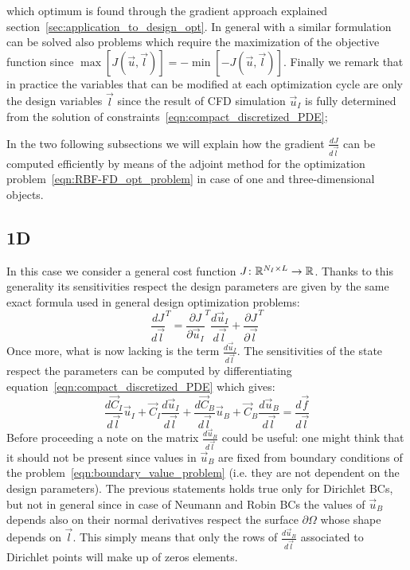 which optimum is found through the gradient approach explained section~\vref{sec:application_to_design_opt}. In general with a similar formulation can be solved also problems which require the maximization of the objective function since $\max \left[ J(\vec{u}, \vec{l}) \right] = - \min \left[ - J(\vec{u}, \vec{l}) \right]$. Finally we remark that in practice the variables that can be modified at each optimization cycle are only the design variables $\vec{l}$ since the result of CFD simulation $\vec{u}_I$ is fully determined from the solution of constraints~\eqref{eqn:compact_discretized_PDE};

In the two following subsections we will explain how the gradient $\frac{dJ}{d\vec{l}}$ can be computed efficiently by means of the adjoint method for the optimization problem~\eqref{eqn:RBF-FD_opt_problem} in case of one and three-dimensional objects.


\subsection{1D}
\label{subsec:adjoint_method_RBF-FD_1D}

In this case we consider a general cost function $J \colon \mathbb{R}^{N_I \times L} \to \mathbb{R}$. Thanks to this generality its sensitivities respect the design parameters are given by the same exact formula used in general design optimization problems:
\begin{equation}
	\label{eqn:}
	\frac{dJ}{d\vec{l}}^T = \frac{\partial J}{\partial \vec{u}_I}^T \frac{d\vec{u}_I}{d\vec{l}} + \frac{\partial J}{\partial \vec{l}}^T
\end{equation}
Once more, what is now lacking is the term $\frac{d\vec{u}_I}{d\vec{l}}$. The sensitivities of the state respect the parameters can be computed by differentiating equation~\eqref{eqn:compact_discretized_PDE} which gives:
\begin{equation}
	\label{eqn:gradient_1st_step_1D_RBF-FD}
	\frac{d\vec{C}_I}{d\vec{l}} \vec{u}_I + \vec{C}_I \frac{d\vec{u}_I}{d\vec{l}} + \frac{d\vec{C}_B}{d\vec{l}} \vec{u}_B + \vec{C}_B \frac{d\vec{u}_B}{d\vec{l}} =
	\frac{d\vec{f}}{d\vec{l}}
\end{equation} 
Before proceeding a note on the matrix $\frac{d\vec{u}_B}{d\vec{l}}$ could be useful: one might think that it should not be present since values in $\vec{u}_B$ are fixed from boundary conditions of the problem~\vref{eqn:boundary_value_problem} (i.e. they are not dependent on the design parameters). The previous statements holds true only for Dirichlet BCs, but not in general since in case of Neumann and Robin BCs the values of $\vec{u}_B$ depends also on their normal derivatives respect the surface $\partial\Omega$ whose shape depends on $\vec{l}$. This simply means that only the rows of $\frac{d\vec{u}_B}{d\vec{l}}$ associated to Dirichlet points will make up of zeros elements.

